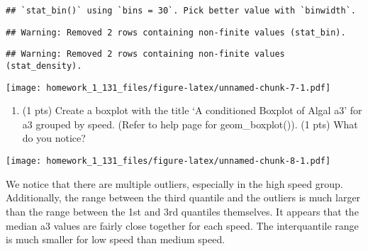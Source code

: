 \documentclass[
]{article}
\newenvironment{Shaded}{\begin{snugshade}}{\end{snugshade}}
\newcommand{\AttributeTok}[1]{\textcolor[rgb]{0.77,0.63,0.00}{#1}}
\newcommand{\CommentTok}[1]{\textcolor[rgb]{0.56,0.35,0.01}{\textit{#1}}}
\newcommand{\FunctionTok}[1]{\textcolor[rgb]{0.00,0.00,0.00}{#1}}
\newcommand{\NormalTok}[1]{#1}
\newcommand{\OtherTok}[1]{\textcolor[rgb]{0.56,0.35,0.01}{#1}}
\newcommand{\SpecialCharTok}[1]{\textcolor[rgb]{0.00,0.00,0.00}{#1}}
\newcommand{\StringTok}[1]{\textcolor[rgb]{0.31,0.60,0.02}{#1}}
\providecommand{\tightlist}{%
  \setlength{\itemsep}{0pt}\setlength{\parskip}{0pt}}
\begin{document}
\begin{verbatim}
## `stat_bin()` using `bins = 30`. Pick better value with `binwidth`.
\end{verbatim}

\begin{verbatim}
## Warning: Removed 2 rows containing non-finite values (stat_bin).
\end{verbatim}

\begin{verbatim}
## Warning: Removed 2 rows containing non-finite values (stat_density).
\end{verbatim}

\texttt{[image: homework\_1\_131\_files/figure-latex/unnamed-chunk-7-1.pdf]}

\begin{enumerate}
\def\labelenumi{\alph{enumi}.}
\setcounter{enumi}{2}
\tightlist
\item
  (1 pts) Create a boxplot with the title `A conditioned Boxplot of
  Algal a3' for a3 grouped by speed. (Refer to help page for
  geom\_boxplot()). (1 pts) What do you notice?
\end{enumerate}

\begin{Shaded}
\end{Shaded}

\texttt{[image: homework\_1\_131\_files/figure-latex/unnamed-chunk-8-1.pdf]}

We notice that there are multiple outliers, especially in the high speed
group. Additionally, the range between the third quantile and the
outliers is much larger than the range between the 1st and 3rd quantiles
themselves. It appears that the median a3 values are fairly close
together for each speed. The interquantile range is much smaller for low
speed than medium speed.
\end{document}
